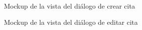 \begin{figure}[H]
    \caption{Mockup de la vista del diálogo de crear cita}
    \label{mockup-add}
\end{figure}

\begin{figure}[H]
    \caption{Mockup de la vista del diálogo de editar cita}
    \label{mockup-edit}
\end{figure}
